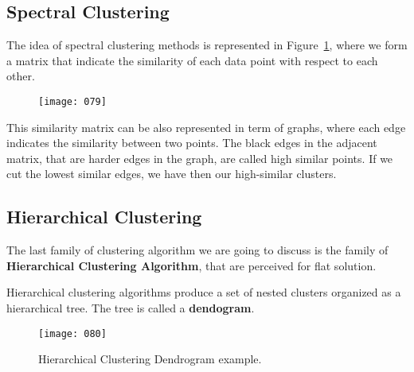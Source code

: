\subsection{Spectral Clustering}
The idea of spectral clustering methods is represented in Figure~\ref{fig:079}, where we form a matrix that indicate the similarity of each data point with respect to each other.

\begin{figure}[h!]
    \centering
    \texttt{[image: 079]}
    \caption{}
    \label{fig:079}
\end{figure}

This similarity matrix can be also represented in term of graphs, where each edge indicates the similarity between two points. The black edges in the adjacent matrix, that are harder edges in the graph, are called high similar points. If we cut the lowest similar edges, we have then our high-similar clusters.

\subsection{Hierarchical Clustering}
The last family of clustering algorithm we are going to discuss is the family of \textbf{Hierarchical Clustering Algorithm}, that are perceived for flat solution. 

Hierarchical clustering algorithms produce a set of nested clusters organized as a hierarchical tree. The tree is called a \textbf{dendogram}.

\begin{figure}[h!]
    \centering
    \texttt{[image: 080]}
    \caption{Hierarchical Clustering Dendrogram example.}
    \label{fig:080}
\end{figure}